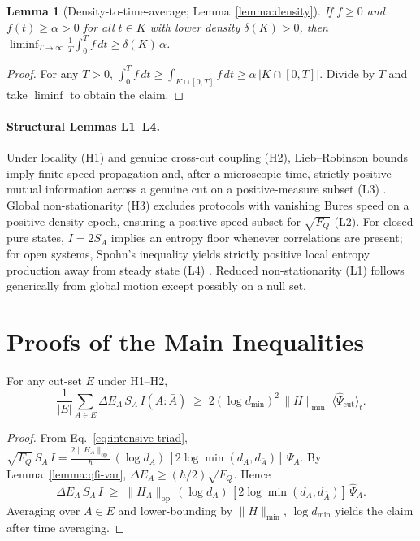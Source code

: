 \documentclass[10pt]{article}
\newtheorem{lemma}{Lemma}
\begin{document}
\begin{lemma}[Density-to-time-average; Lemma~\ref{lemma:density}]
If \(f\ge 0\) and \(f(t)\ge \alpha>0\) for all \(t\in K\) with lower density \(\delta(K)>0\), then \(\liminf_{T\to\infty}\tfrac{1}{T}\int_0^T f\,dt\ge \delta(K)\,\alpha\).
\end{lemma}
\begin{proof}
For any \(T>0\), \(\int_0^T f\,dt\ge \int_{K\cap[0,T]} \! f\,dt\ge \alpha\,|K\cap[0,T]|\). Divide by \(T\) and take \(\liminf\) to obtain the claim.
\end{proof}

\paragraph{Structural Lemmas L1–L4.}
Under locality (H1) and genuine cross-cut coupling (H2), Lieb–Robinson bounds imply finite-speed propagation and, after a microscopic time, strictly positive mutual information across a genuine cut on a positive-measure subset (L3) \cite{NachtergaeleSims2010}. Global non-stationarity (H3) excludes protocols with vanishing Bures speed on a positive-density epoch, ensuring a positive-speed subset for \(\sqrt{F_Q}\) (L2). For closed pure states, \(I=2S_A\) implies an entropy floor whenever correlations are present; for open systems, Spohn’s inequality yields strictly positive local entropy production away from steady state (L4) \cite{Spohn1978}. Reduced non-stationarity (L1) follows generically from global motion except possibly on a null set.

\section{Proofs of the Main Inequalities}

\begin{theorem*}
For any cut-set \(E\) under H1–H2,
\[
\frac{1}{|E|}\sum_{A\in E} \Delta E_A\,S_A\,I(A{:}\bar A)
\;\ge\; 2(\log d_{\min})^2\,\lVert H\rVert_{\min}\;\big\langle \widehat{\Psi}_{\mathrm{cut}}\big\rangle_t.
\]
\end{theorem*}
\begin{proof}
From Eq.~\eqref{eq:intensive-triad},
\(\sqrt{F_Q}\,S_A\,I = \tfrac{2\lVert H_A\rVert_{\mathrm{op}}}{\hbar}\,(\log d_A)\,[2\log\min(d_A,d_{\bar A})] \,\widehat{\Psi}_A\).
By Lemma~\ref{lemma:qfi-var}, \(\Delta E_A\ge (\hbar/2)\sqrt{F_Q}\). Hence
\[
\Delta E_A\,S_A\,I \;\ge\; \lVert H_A\rVert_{\mathrm{op}}\,(\log d_A)\,[2\log\min(d_A,d_{\bar A})] \,\widehat{\Psi}_A.
\]
Averaging over \(A\in E\) and lower-bounding by \(\lVert H\rVert_{\min}\), \(\log d_{\min}\) yields the claim after time averaging.
\end{proof}
\end{document}
